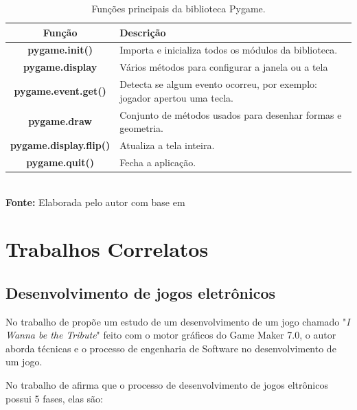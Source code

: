 \FloatBarrier
\begin{table}[!htbp]
	\centering
	\caption{Funções principais da biblioteca Pygame.}
	\begin{tabular}{ c | p{6cm} }
		\hline
			\textbf{Função} & \textbf{Descrição} \\ \hline
			\textbf{pygame.init()} & Importa e inicializa todos os módulos da biblioteca. \\ \hline
			\textbf{pygame.display} & Vários métodos para configurar a janela ou a tela \\ \hline
			\textbf{pygame.event.get()} & Detecta se algum evento ocorreu, por exemplo: jogador apertou uma tecla. \\ \hline
			\textbf{pygame.draw} & Conjunto de métodos usados para desenhar formas e geometria. \\ \hline
			\textbf{pygame.display.flip()} & Atualiza a tela inteira. \\ \hline
			\textbf{pygame.quit()} & Fecha a aplicação. \\ \hline
	\end{tabular}
	\\ \vspace{0.2cm}
	\textbf{Fonte:} Elaborada pelo autor com base em \cite{pygame2025}
	\label{pygame}
\end{table}
\FloatBarrier

\section{Trabalhos Correlatos}
\subsection{Desenvolvimento de jogos eletrônicos}

No trabalho de \cite{morais2009jogos} propõe um estudo de um desenvolvimento de um jogo chamado "\textit{I Wanna be the
Tribute}" feito com o motor gráficos do Game Maker 7.0, o autor aborda técnicas e o processo de engenharia de Software 
no desenvolvimento de um jogo.

No trabalho de \cite{morais2009jogos} afirma que o processo de desenvolvimento de jogos eltrônicos possui 5 fases, elas são:

